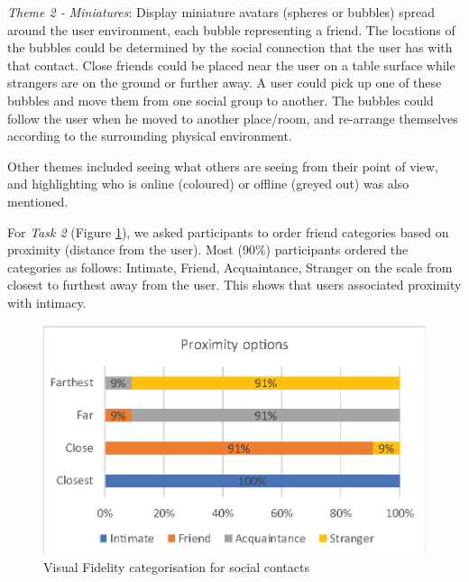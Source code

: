 \textit{Theme 2 - Miniatures}: Display miniature avatars (spheres or bubbles) spread around the user environment, each bubble representing a friend. The locations of the bubbles could be determined by the social connection that the user has with that contact. Close friends could be placed near the user on a table surface while strangers are on the ground or further away. A user could pick up one of these bubbles and move them from one social group to another. The bubbles could follow the user when he moved to another place/room, and re-arrange themselves according to the surrounding physical environment.

Other themes included seeing what others are seeing from their point of view, and highlighting who is online (coloured) or offline (greyed out) was also mentioned.



For \textit{Task 2} (Figure \ref{fig:contacts:visual-fidelity}), we asked participants to order friend categories based on proximity (distance from the user). Most (90\%) participants ordered the categories as follows: Intimate, Friend, Acquaintance, Stranger on the scale from closest to furthest away from the user. This shows that users associated proximity with intimacy.

\begin{figure}[ht]
    \centering
    \includegraphics[width=0.8\linewidth]{images/mgia17/analysis-images-06.eps}
    \caption{Visual Fidelity categorisation for social contacts}
    \label{fig:contacts:visual-fidelity}
\end{figure}

